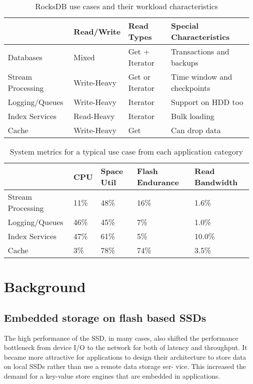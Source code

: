 \documentclass[11pt]{article}
\begin{document}
\begin{table}[htbp]
\caption{RocksDB use cases and their workload characteristics}
\centering
\begin{tabular}{llll}
\hline
 & Read/Write & Read Types & Special Characteristics\\
\hline
Databases & Mixed & Get + Iterator & Transactions and backups\\
Stream Processing & Write-Heavy & Get or Iterator & Time window and checkpoints\\
Logging/Queues & Write-Heavy & Iterator & Support on HDD too\\
Index Services & Read-Heavy & Iterator & Bulk loading\\
Cache & Write-Heavy & Get & Can drop data\\
\hline
\end{tabular}
\end{table}


\begin{table}[htbp]
\caption{System metrics for a typical use case from each application category}
\centering
\begin{tabular}{lllll}
\hline
 & CPU & Space Util & Flash Endurance & Read Bandwidth\\
\hline
Stream Processing & 11\% & 48\% & 16\% & 1.6\%\\
Logging/Queues & 46\% & 45\% & 7\% & 1.0\%\\
Index Services & 47\% & 61\% & 5\% & 10.0\%\\
Cache & 3\% & 78\% & 74\% & 3.5\%\\
\hline
\end{tabular}
\end{table}
\section{Background}
\label{sec:orgcc6a34e}
\subsection{Embedded storage on flash based SSDs}
\label{sec:orgd473101}
The high performance of the SSD, in many cases, also shifted the performance bottleneck from device
I/O to the network for both of latency and throughput. It became more attractive for applications to
design their architecture to store data on local SSDs rather than use a remote data storage ser- vice.
This increased the demand for a key-value store engines that are embedded in applications.
\end{document}
